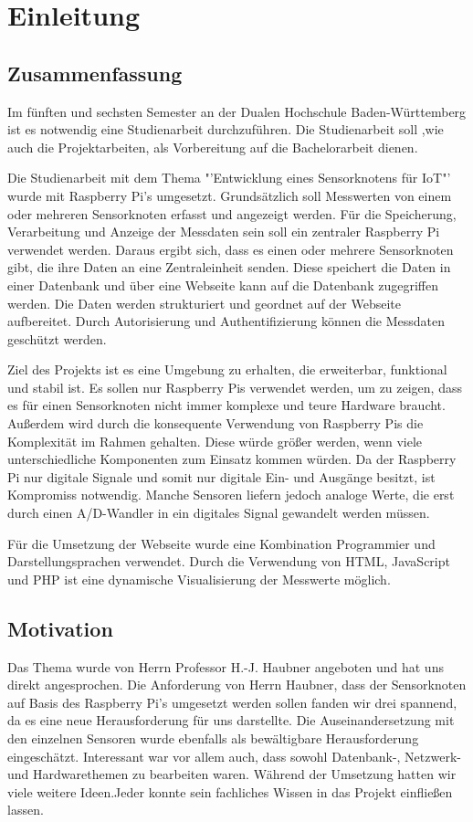 \chapter{Einleitung}
\section{Zusammenfassung}
Im fünften und sechsten Semester an der Dualen Hochschule Baden-Württemberg ist es notwendig eine Studienarbeit durchzuführen. Die Studienarbeit soll ,wie auch die Projektarbeiten, als Vorbereitung auf die Bachelorarbeit dienen. 

Die Studienarbeit mit dem Thema "'Entwicklung eines Sensorknotens für IoT"' wurde mit Raspberry Pi's umgesetzt. Grundsätzlich soll Messwerten von einem oder mehreren Sensorknoten erfasst und angezeigt werden. Für die Speicherung, Verarbeitung und Anzeige der Messdaten sein soll ein zentraler Raspberry Pi verwendet werden. Daraus ergibt sich, dass es einen oder mehrere Sensorknoten gibt, die ihre Daten an eine Zentraleinheit senden. Diese speichert die Daten in einer Datenbank und über eine Webseite kann auf die Datenbank zugegriffen werden. Die Daten werden strukturiert und geordnet auf der Webseite aufbereitet. Durch Autorisierung und Authentifizierung können die Messdaten geschützt werden.

Ziel des Projekts ist es eine Umgebung zu erhalten, die erweiterbar, funktional und stabil ist. Es sollen nur Raspberry Pis verwendet werden, um zu zeigen, dass es für einen Sensorknoten nicht immer komplexe und teure Hardware braucht. Außerdem wird durch die konsequente Verwendung von Raspberry Pis die Komplexität im Rahmen gehalten. Diese würde größer werden, wenn viele unterschiedliche Komponenten zum Einsatz kommen würden. Da der Raspberry Pi nur digitale Signale und somit nur digitale Ein- und Ausgänge besitzt, ist Kompromiss notwendig. Manche Sensoren liefern jedoch analoge Werte, die erst durch einen \ac{A/D-Wandler} in ein digitales Signal gewandelt werden müssen. 

Für die Umsetzung der  Webseite wurde eine Kombination Programmier und Darstellungsprachen verwendet. Durch die Verwendung von \ac{HTML}, JavaScript und \ac{PHP} ist eine dynamische Visualisierung der Messwerte möglich.

\section{Motivation}
Das Thema wurde von Herrn Professor H.-J. Haubner angeboten und hat uns direkt angesprochen. Die Anforderung von Herrn Haubner, dass der Sensorknoten auf Basis des Raspberry Pi's umgesetzt werden sollen fanden wir drei spannend, da es eine neue Herausforderung für uns darstellte. Die Auseinandersetzung mit den einzelnen Sensoren wurde ebenfalls als bewältigbare Herausforderung eingeschätzt. Interessant war vor allem auch, dass sowohl Datenbank-, Netzwerk- und Hardwarethemen zu bearbeiten waren. Während der Umsetzung hatten wir viele weitere Ideen.Jeder konnte sein fachliches Wissen in das Projekt einfließen lassen. 
